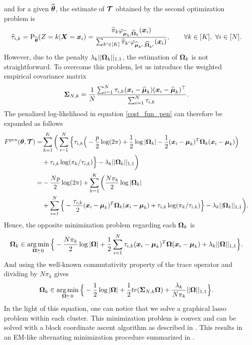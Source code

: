 and for a given $\widehat{{\boldsymbol\theta}}$, the estimate of $\boldsymbol{\mathcal T}$ obtained by the second optimization problem is
\begin{equation}
\label{em-sols-tau}
\widehat\tau_{i,k} = \textnormal{P}_{\widehat{{\boldsymbol\theta}}}(Z=k|\boldsymbol X=\boldsymbol x_i)=\frac{\widehat\pi_k\varphi_{\widehat{\boldsymbol\mu}_k,\widehat{\boldsymbol\Omega}_k}(\boldsymbol x_i)}{\sum_{k'\in[K]}\widehat\pi_{k'}\varphi_{\widehat{\boldsymbol\mu}_{k'},\widehat{\boldsymbol\Omega}_{k'}}(\boldsymbol x_i)},\qquad\forall k\in[K],\ \forall i\in[N].
\end{equation}
However, due to the penalty $\lambda_k||\boldsymbol\Omega_k||_{1,1}$, the estimation of $\boldsymbol\Omega_k$ is not straightforward. To overcome this problem, let us introduce the weighted empirical covariance matrix
\begin{equation}
\boldsymbol\Sigma_{N,k} = \frac{1}{N}\frac{\sum_{i=1}^N\tau_{i,k}(\boldsymbol x_i-\widehat{\boldsymbol\mu}_k)(\boldsymbol x_i-\widehat{\boldsymbol\mu}_k)^\top}{\sum_{i=1}^N\tau_{i,k}}.
\end{equation}
The penalized log-likelihood in equation \eqref{cost_fun_pen} can therefore be expanded as follows
\begin{align*}
\label{cost_fun_pen_2}
F^{pen}({\boldsymbol\theta},\boldsymbol{\mathcal T})  =& \sum_{k=1}^K \bigg( \sum_{i=1}^{N}\Big\{ \tau_{i,k} \Big(
-\frac{p}{2}\log(2\pi)+\frac{1}{2}\log|\boldsymbol\Omega_k|
-\frac{1}{2}(\boldsymbol x_i-\boldsymbol\mu_k)^T\boldsymbol\Omega_k(\boldsymbol x_i-\boldsymbol\mu_k) \Big)\\
&+\tau_{i,k} \log(\pi_k/\tau_{i,k})\Big\} -\lambda_k||\boldsymbol\Omega_k||_{1,1}\bigg)\\
=& -\frac{Np}{2}\log(2\pi)+\sum_{k=1}^K \bigg(\frac{N\pi_k}{2}\log|\boldsymbol\Omega_k|\\
&+\sum_{i=1}^{N}\Big\{ -\frac{\tau_{i,k}}{2}(\boldsymbol x_i-\boldsymbol\mu_k)^T\boldsymbol\Omega_k(\boldsymbol x_i-\boldsymbol\mu_k)+\tau_{i,k} \log(\pi_k/\tau_{i,k})\Big\} -\lambda_k||\boldsymbol\Omega_k||_{1,1}\bigg). 
\end{align*}
Hence, the opposite minimization problem regarding each $\boldsymbol\Omega_k$ is
\begin{equation}
\boldsymbol\Omega_k \in \operatorname*{arg\,min}_{ \boldsymbol\Omega\succeq 0}\Big\{-\frac{N\pi_k}{2}\log|\boldsymbol\Omega|+\frac{1}{2}\sum_{i=1}^{N}\tau_{i,k}(\boldsymbol x_i-\boldsymbol\mu_k)^T\boldsymbol\Omega(\boldsymbol x_i-\boldsymbol\mu_k)+\lambda_k||\boldsymbol\Omega||_{1,1}\Big\}.
\end{equation}
And using the well-known commutativity property of the trace operator and dividing by $N\pi_k$ gives
\begin{equation}
\boldsymbol\Omega_k \in \operatorname*{arg\,min}_{ \boldsymbol\Omega\succeq 0} \Big\{ -\frac{1}{2}\log|\boldsymbol\Omega| +\frac{1}{2} tr(\boldsymbol\Sigma_{N,k}\boldsymbol\Omega)+\frac{\lambda_k}{N\pi_k}||\boldsymbol\Omega||_{1,1}\Big\}.
\end{equation}
In the light of this equation, one can notice that we solve a graphical lasso problem within each cluster. This minimization problem is convex and can be solved with a block coordinate ascent algorithm as described in \citep{mazum_lasso}. This results in an EM-like alternating minimization procedure summarized in .
